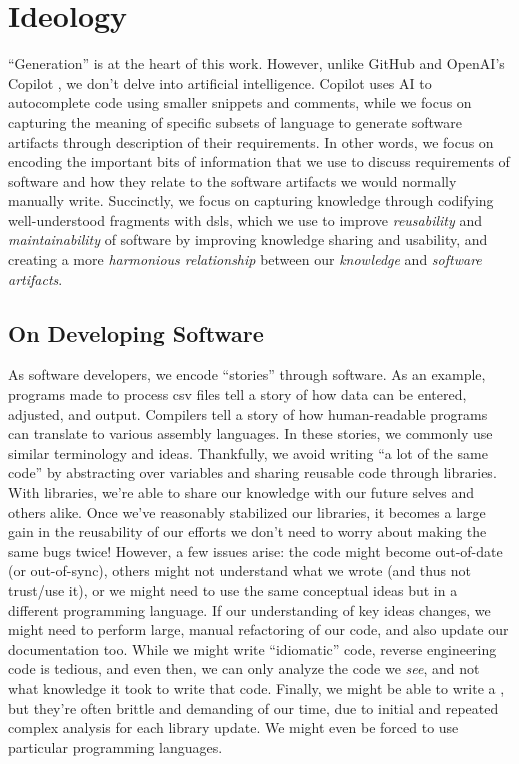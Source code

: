 \chapter[Ideology]{Ideology\footnotemark}
\label{chap:ideology}

``Generation'' is at the heart of this work. However, unlike GitHub and OpenAI's
Copilot \cite{Copilot}, we don't delve into artificial intelligence. Copilot
uses AI to autocomplete code using smaller snippets and comments, while we focus
on capturing the meaning of specific subsets of language to generate software
artifacts through description of their requirements. In other words, we focus on
encoding the important bits of information that we use to discuss requirements
of software and how they relate to the software artifacts we would normally
manually write. Succinctly, we focus on capturing knowledge through codifying
well-understood fragments with \acsp{dsl}, which we use to improve
\textit{reusability} and \textit{maintainability} of software by improving
knowledge sharing and usability, and creating a more \textit{harmonious
relationship} between our \textit{knowledge} and \textit{software artifacts}.

\section{On Developing Software}
\label{chap:ideology:sec:on_developing_software}

As software developers, we encode ``stories'' through software. As an example,
programs made to process \acs{csv} files tell a story of how data can be
entered, adjusted, and output. Compilers tell a story of how human-readable
programs can translate to various assembly languages. In these stories, we
commonly use similar terminology and ideas. Thankfully, we avoid writing ``a lot
of the same code'' by abstracting over variables and sharing reusable code
through libraries. With libraries, we're able to share our knowledge with our
future selves and others alike. Once we've reasonably stabilized our libraries,
it becomes a large gain in the reusability of our efforts \textemdash we don't
need to worry about making the same bugs twice! However, a few issues arise: the
code might become out-of-date (or out-of-sync), others might not understand what
we wrote (and thus not trust/use it), or we might need to use the same
conceptual ideas but in a different programming language. If our understanding
of key ideas changes, we might need to perform large, manual refactoring of our
code, and also update our documentation too. While we might write ``idiomatic''
code, reverse engineering code is tedious, and even then, we can only analyze
the code we \textit{see}, and not what knowledge it took to write that code.
Finally, we might be able to write a , but they're often brittle and
demanding of our time, due to initial and repeated complex analysis for each
library update. We might even be forced to use particular programming languages.

